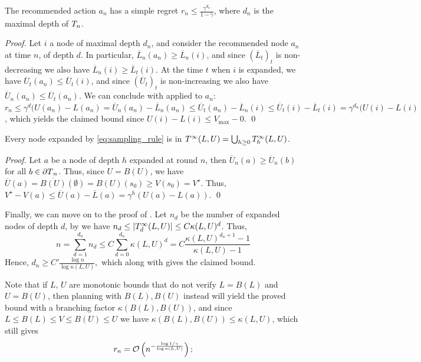 \documentclass[runningheads]{llncs}
\begin{document}
\begin{lemma}
The recommended action $a_n$ has a simple regret $r_n \leq \frac{\gamma^{d_n}}{1-\gamma}$, where $d_n$ is the maximal depth of $T_n$.
\end{lemma}
\begin{proof}
Let $i$ a node of maximal depth $d_n$, and consider the recommended node $a_n$ at time $n$, of depth $d$. In particular, $\overline{L}_n(a_n) \geq \overline{L}_n(i)$, and since $(\overline{L}_t)_t$ is non-decreasing we also have $\overline{L}_n(i) \geq \overline{L}_t(i)$. At the time $t$ when $i$ is expanded, we have $\overline{U}_t(a_n) \leq \overline{U}_t(i)$, and since $(\overline{U}_t)_t$ is non-increasing we also have $\overline{U}_n(a_n) \leq \overline{U}_t(a_n)$. We can conclude with  applied to $a_n$: $r_n \leq \gamma^d(U(a_n)-L(a_n) = \overline{U}_n(a_n) - \overline{L}_n(a_n)  \leq \overline{U}_t(a_n) - \overline{L}_n(i) \leq \overline{U}_t(i) - \overline{L}_t(i) = \gamma^{d_n}(U(i) - L(i)$, which yields the claimed bound since $U(i) - L(i) \leq V_{\max}-0$.
\qed\end{proof}

\begin{lemma}
\label{lemma:expansion-tree}
Every node expanded by \eqref{eq:sampling_rule} is in $T^\infty(L,U) = \bigcup_{h\geq 0} T^\infty_h(L,U)$.
\end{lemma}
\begin{proof}
Let $a$ be a node of depth $h$ expanded at round $n$, then $\overline{U}_n(a) \geq \overline{U}_n(b)$ for all $b\in{\partial T}_n$. Thus, since $U = B(U)$, we have $\overline{U}(a) = \overline{B(U)}(\emptyset) = B(U)(s_0) \geq V(s_0) = V^\star$. Thus, $V^\star - V(a) \leq \overline{U}(a) - \overline{L}(a) = \gamma^h(U(a) - L(a))$.
\qed\end{proof}

Finally, we can move on to the proof of .
Let $n_d$ be the number of expanded nodes of depth $d$, by  we have $n_d \leq |T^\infty_d(L,U)| \leq C\kappa(L,U)^d$. Thus, 
\[n = \sum_{d=1}^{d_n} n_d \leq C\sum_{d=0}^{d_n} \kappa(L,U)^d = C\frac{\kappa(L,U)^{d_n+1}-1}{\kappa(L,U)-1}\]
Hence, $d_n \geq C'\frac{\log n}{\log\kappa(L,U)},$ which along with  gives the claimed bound.

Note that if $L,\,U$ are monotonic bounds that do not verify $L = B(L)$ and $U=B(U)$, then planning with $B(L),B(U)$ instead will yield the proved bound with a branching factor $\kappa(B(L),B(U))$, and since $L\leq B(L)\leq V\leq B(U)\leq U$ we have $\kappa(B(L),B(U)) \leq \kappa(L,U)$, which still gives \begin{align*}
r_n = \mathcal{O}\left(n^{-\frac{\log 1/\gamma}{\log \kappa(L,U)}}\right);
\end{align*}
\end{document}
